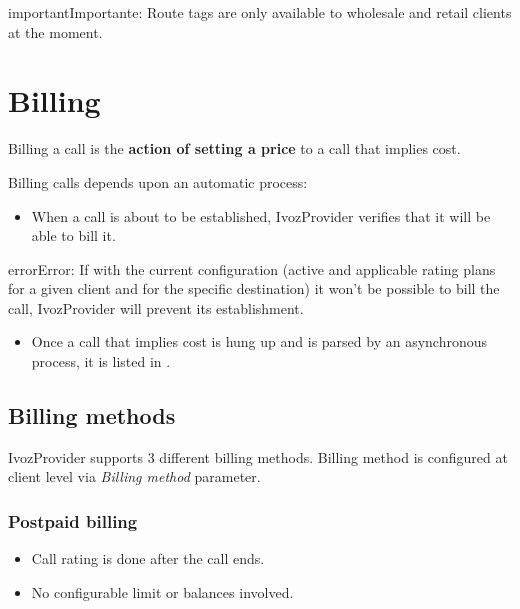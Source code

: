 \documentclass[letterpaper,10pt,spanish]{sphinxmanual}
\begin{document}
\begin{notice}{important}{Importante:}
Route tags are only available to wholesale and retail clients at the moment.
\end{notice}


\section{Billing}
\label{administration_portal/brand/billing/index::doc}\label{administration_portal/brand/billing/index:billing}
Billing a call is the \textbf{action of setting a price} to a call that implies cost.

Billing calls depends upon an automatic process:
\begin{itemize}
\item {} 
When a call is about to be established, IvozProvider verifies that it will be able to bill it.

\end{itemize}

\begin{notice}{error}{Error:}
If with the current configuration (active and applicable rating plans for
a given client and for the specific destination) it won't be possible to
bill the call, IvozProvider will prevent its establishment.
\end{notice}
\begin{itemize}
\item {} 
Once a call that implies cost is hung up and is parsed by an asynchronous process, it is listed in {\hyperref[administration_portal/platform/external_calls:external\string-calls]{}}.

\end{itemize}


\subsection{Billing methods}
\label{administration_portal/brand/billing/index:billing-methods}
IvozProvider supports 3 different billing methods. Billing method is configured at client level via \emph{Billing method} parameter.


\subsubsection{Postpaid billing}
\label{administration_portal/brand/billing/index:postpaid-billing}\begin{itemize}
\item {} 
Call rating is done after the call ends.

\item {} 
No configurable limit or balances involved.

\end{itemize}
\end{document}
